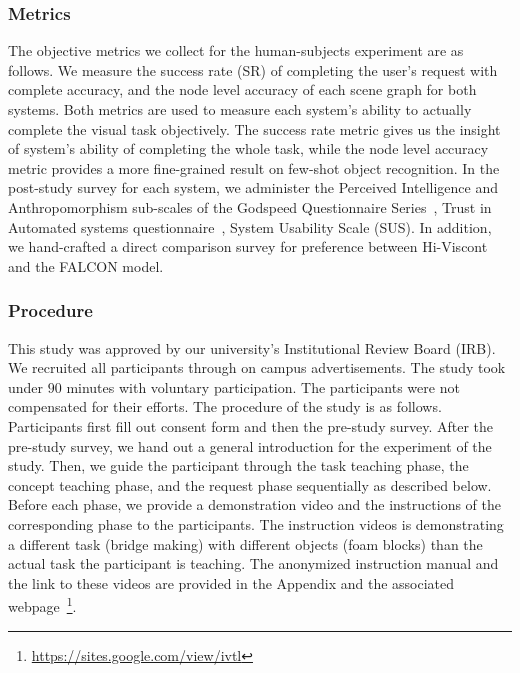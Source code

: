 \subsubsection{Metrics}
The objective metrics we collect for the human-subjects experiment are as follows. 
We measure the success rate (SR) of completing the user's request with complete accuracy, and the node level accuracy of each scene graph for both systems.
Both metrics are used to measure each system's ability to actually complete the visual task objectively.
The success rate metric gives us the insight of system's ability of completing the whole task, while the node level accuracy metric provides a more fine-grained result on few-shot object recognition.
In the post-study survey for each system, we administer the Perceived Intelligence and Anthropomorphism sub-scales of the Godspeed Questionnaire Series~\cite{Bartneck2009MeasurementIF}, Trust in Automated systems questionnaire~\cite{trust_survey}, System Usability Scale (SUS)\cite{article}.
In addition, we hand-crafted a direct comparison survey for preference between Hi-Viscont and the FALCON model.

\subsubsection{Procedure}
This study was approved by our university's Institutional Review Board (IRB). We recruited all participants through on campus advertisements. 
The study took under $90$ minutes with voluntary participation. The participants were not compensated for their efforts. The procedure of the study is as follows. 
Participants first fill out consent form and then the pre-study survey.
After the pre-study survey, we hand out a general introduction for the experiment of the study.
Then, we guide the participant through the task teaching phase, the concept teaching phase, and the request phase sequentially as described below. 
Before each phase, we provide a demonstration video and the instructions of the corresponding phase to the participants. The instruction videos is demonstrating a different task (bridge making) with different objects (foam blocks) than the actual task the participant is teaching. 
The anonymized instruction manual and the link to these videos are provided in the Appendix and the associated webpage~\footnote{\url{https://sites.google.com/view/ivtl}}.

